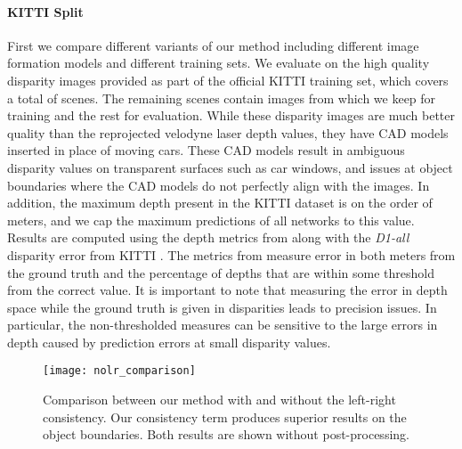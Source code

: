 \documentclass[10pt,twocolumn,letterpaper]{article}
\begin{document}
\paragraph{KITTI Split}
First we compare different variants of our method including different image formation models and different training sets. 
We evaluate on the  high quality disparity images provided as part of the official KITTI training set, which covers a total of  scenes. The remaining  scenes contain  images from which we keep  for training and the rest for evaluation.
While these disparity images are much better quality than the reprojected velodyne laser depth values, they have CAD models inserted in place of moving cars. 
These CAD models result in ambiguous disparity values on transparent surfaces such as car windows, and issues at object boundaries where the CAD models do not perfectly align with the images.
In addition, the maximum depth present in the KITTI dataset is on the order of  meters, and we cap the maximum predictions of all networks to this value.
Results are computed using the depth metrics from \cite{eigen2014depth} along with the {\it D1-all} disparity error from KITTI \cite{Geiger2012CVPR}.
The metrics from \cite{eigen2014depth} measure error in both meters from the ground truth and the percentage of depths that are within some threshold from the correct value.
It is important to note that measuring the error in depth space while the ground truth is given in disparities leads to precision issues. 
In particular, the non-thresholded measures can be sensitive to the large errors in depth caused by prediction errors at small disparity values.

\begin{figure}[b]
  \centering
  \texttt{[image: nolr\_comparison]}
  \caption{Comparison between our method with and without the left-right consistency. Our consistency term produces superior results on the object boundaries. Both results are shown without post-processing.}
  \label{fig:lr_consistency_results}     
\end{figure}
\end{document}
